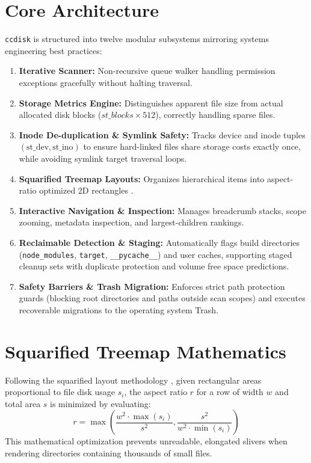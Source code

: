 \documentclass[11pt,article,a4paper]{article}
\begin{document}
\section{Core Architecture}
\texttt{ccdisk} is structured into twelve modular subsystems mirroring systems engineering best practices:
\begin{enumerate}
    \item \textbf{Iterative Scanner:} Non-recursive queue walker handling permission exceptions gracefully without halting traversal.
    \item \textbf{Storage Metrics Engine:} Distinguishes apparent file size from actual allocated disk blocks ($st\_blocks \times 512$), correctly handling sparse files.
    \item \textbf{Inode De-duplication \& Symlink Safety:} Tracks device and inode tuples $(\text{st\_dev}, \text{st\_ino})$ to ensure hard-linked files share storage costs exactly once, while avoiding symlink target traversal loops.
    \item \textbf{Squarified Treemap Layouts:} Organizes hierarchical items into aspect-ratio optimized 2D rectangles \cite{johnson1991treemaps}.
    \item \textbf{Interactive Navigation \& Inspection:} Manages breadcrumb stacks, scope zooming, metadata inspection, and largest-children rankings.
    \item \textbf{Reclaimable Detection \& Staging:} Automatically flags build directories (\texttt{node\_modules}, \texttt{target}, \texttt{\_\_pycache\_\_}) and user caches, supporting staged cleanup sets with duplicate protection and volume free space predictions.
    \item \textbf{Safety Barriers \& Trash Migration:} Enforces strict path protection guards (blocking root directories and paths outside scan scopes) and executes recoverable migrations to the operating system Trash.
\end{enumerate}

\section{Squarified Treemap Mathematics}
Following the squarified layout methodology \cite{bruls2000squarified}, given rectangular areas proportional to file disk usage $s_i$, the aspect ratio $r$ for a row of width $w$ and total area $s$ is minimized by evaluating:
\begin{equation}
r = \max\left(\frac{w^2 \cdot \max(s_i)}{s^2}, \frac{s^2}{w^2 \cdot \min(s_i)}\right)
\end{equation}
This mathematical optimization prevents unreadable, elongated slivers when rendering directories containing thousands of small files.
\end{document}
